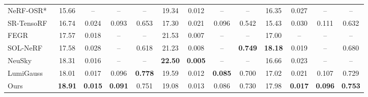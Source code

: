 \begin{table}[!tb]
\begin{tabular}{l cccc cccc cccc}
        NeRF-OSR*~\cite{rudnev2022nerfOSR}            & 15.66                             & --                                & --                                & --               & 19.34          & 0.012          & --             & --             & 16.35          & 0.027          & --             & --             \\
        SR-TensoRF~\cite{jin2023tensoir}              & 16.74                             & 0.024                             & 0.093                             & 0.653            & 17.30          & 0.021          & 0.096          & 0.542          & 15.43          & 0.030          & 0.111          & 0.632          \\
        FEGR~\cite{fegr2024}                          & 17.57                             & 0.018                             & --                                & --               & 21.53          & 0.007          & --             & --             & 17.00          & --             & --             & --             \\
        SOL-NeRF~\cite{solnerf2024}                   & 17.58                             & 0.028                             & --                                & 0.618            & 21.23          & 0.008          & --             & \textbf{0.749} & \textbf{18.18} & 0.019          & --             & 0.680          \\
        NeuSky~\cite{neusky2024}                      & 18.31                             & 0.016                             & --                                & --               & \textbf{22.50} & \textbf{0.005} & --             & --             & 16.66          & 0.023          & --             & --             \\
        LumiGauss~\cite{joaxkal2024lumigauss}         & 18.01                             & 0.017                             & 0.096                             & \textbf{0.778}   & 19.59          & 0.012          & \textbf{0.085} & 0.700          & 17.02          & 0.021          & 0.107          & 0.729          \\
        Ours                                          & \textbf{18.91}                    & \textbf{0.015}                    & \textbf{0.091}                    & 0.751            & 19.08          & 0.013          & 0.086          & 0.730          & 17.98          & \textbf{0.017} & \textbf{0.096} & \textbf{0.753} \\

\end{tabular}
\end{table}
